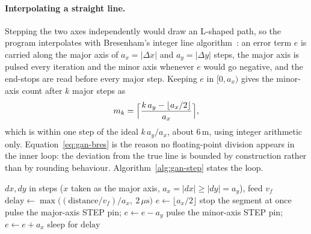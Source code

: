 \paragraph{Interpolating a straight line.}
Stepping the two axes independently would draw an L-shaped path, so the program interpolates with Bresenham's integer line algorithm~\cite[p.~28]{bresenham1965}: an error term $e$ is carried along the major axis of $a_x=|\Delta x|$ and $a_y=|\Delta y|$ steps, the major axis is pulsed every iteration and the minor axis whenever $e$ would go negative, and the end-stops are read before every major step. Keeping $e$ in $[0,a_x)$ gives the minor-axis count after $k$ major steps as
\begin{equation}
m_k=\Bigl\lceil\frac{k\,a_y-\lfloor a_x/2\rfloor}{a_x}\Bigr\rceil,
\label{eq:gan-bres}
\end{equation}
which is within one step of the ideal $k\,a_y/a_x$, about 6\,\textmu m, using integer arithmetic only. Equation~\ref{eq:gan-bres} is the reason no floating-point division appears in the inner loop: the deviation from the true line is bounded by construction rather than by rounding behaviour. Algorithm~\ref{alg:gan-step} states the loop.

\begin{algorithm}[!htbp]
\caption{Interpolated segment with in-loop end-stop check}
\label{alg:gan-step}
\begin{algorithmic}[1]
\REQUIRE $dx,dy$ in steps ($x$ taken as the major axis, $a_x=|dx|\ge|dy|=a_y$), feed $v_f$
\STATE $\mathrm{delay}\leftarrow\max\bigl((\mathrm{distance}/v_f)/a_x,\ 2\,\mu\mathrm{s}\bigr)$ 
\STATE $e\leftarrow\lfloor a_x/2\rfloor$ 
        \STATE stop the segment at once 
    \ENDIF
    \STATE pulse the major-axis STEP pin; $e\leftarrow e-a_y$
        \STATE pulse the minor-axis STEP pin; $e\leftarrow e+a_x$
    \ENDIF
    \STATE sleep for $\mathrm{delay}$
\ENDFOR
\end{algorithmic}
\end{algorithm}

